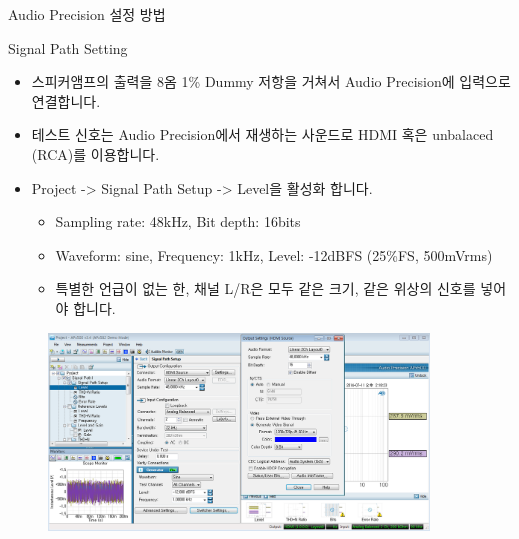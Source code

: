 \documentclass{beamer}
\begin{document}
\begin{frame}{}
\tableofcontents
\huge Audio Precision 설정 방법\\
\end{frame}



\begin{frame}[t]{Signal Path Setting}
\begin{itemize}
\item 스피커앰프의 출력을 8옴 1\% Dummy 저항을 거쳐서 Audio Precision에 입력으로 연결합니다.
\item 테스트 신호는 Audio Precision에서 재생하는 사운드로 HDMI 혹은 unbalaced (RCA)를 이용합니다.
\item Project -> Signal Path Setup -> Level을 활성화 합니다.
	\begin{itemize}
	\item Sampling rate: 48kHz, Bit depth: 16bits
	\item Waveform: sine, Frequency: 1kHz, Level: -12dBFS (25\%FS, 500mVrms)
	\item 특별한 언급이 없는 한, 채널 L/R은 모두 같은 크기, 같은 위상의 신호를 넣어야 합니다.
	\end{itemize}
\end{itemize}

\begin{figure}[b]
\includegraphics[width=0.9\textwidth]{figure/apsetting/signalPath.png}
\end{figure}

\end{frame}
\end{document}
